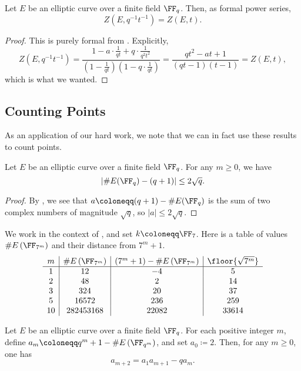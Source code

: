 \documentclass{amsart}
\begin{document}
\begin{theorem} \label{thm:fe}
	Let $E$ be an elliptic curve over a finite field $\FF_q$. Then, as formal power series,
	\[Z\left(E,q^{-1}t^{-1}\right)=Z(E,t).\]
\end{theorem}
\begin{proof}
	This is purely formal from . Explicitly,
	\[Z\left(E,q^{-1}t^{-1}\right)=\frac{1-a\cdot\frac1{qt}+q\cdot\frac1{q^2t^2}}{\left(1-\frac1{qt}\right)\left(1-q\cdot\frac1{qt}\right)}=\frac{qt^2-at+1}{(qt-1)(t-1)}=Z(E,t),\]
	which is what we wanted.
\end{proof}

\subsection{Counting Points} \label{subsec:count}
As an application of our hard work, we note that we can in fact use these results to count points.
\begin{corollary}[Hasse]
	Let $E$ be an elliptic curve over a finite field $\FF_q$. For any $m\ge0$, we have
	\[\left|\#E(\FF_q)-(q+1)\right|\le2\sqrt q.\]
\end{corollary}
\begin{proof}
	By , we see that $a\coloneqq(q+1)-\#E(\FF_q)$ is the sum of two complex numbers of magnitude $\sqrt q$, so $\left|a\right|\le2\sqrt q$.
\end{proof}
\begin{example} \label{ex:hasse-ex}
	We work in the context of , and set $k\coloneqq\FF_7$. Here is a table of values $\#E\left(\FF_{7^m}\right)$ and their distance from $7^m+1$.
	\[\begin{array}{c|c|c|c}
		m & \#E\left(\FF_{7^m}\right) & \left(7^m+1\right)-\#E\left(\FF_{7^m}\right) & \floor{\sqrt{7^m}} \\\hline
		1 & 12 & -4 & 5 \\
		2 & 48 & 2 & 14 \\
		3 & 324 & 20 & 37 \\
		5 & 16572 & 236 & 259 \\
		10 & 282453168 & 22082 & 33614
	\end{array}\]
\end{example}
\begin{corollary} \label{cor:count-by-recursion}
	Let $E$ be an elliptic curve over a finite field $\FF_q$. For each positive integer $m$, define $a_m\coloneqq q^m+1-\#E\left(\FF_{q^m}\right)$, and set $a_0\coloneqq2$. Then, for any $m\ge0$, one has
	\[a_{m+2}=a_1a_{m+1}-qa_m.\]
\end{corollary}
\end{document}

